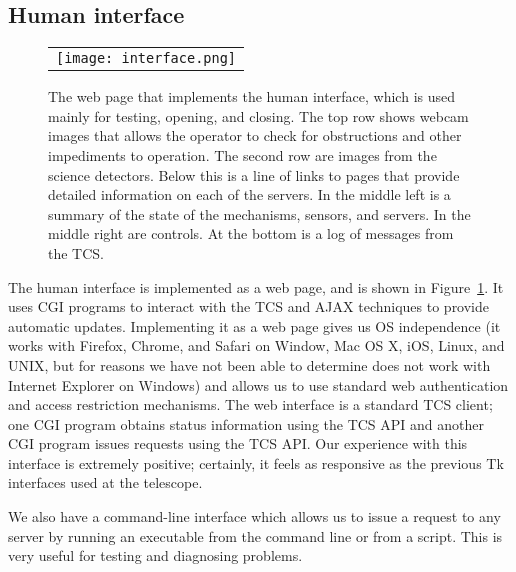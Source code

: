 \documentclass{article}
\begin{document}
\subsection{Human interface}

\begin{figure}
\begin{center}
\begin{tabular}{c}
\texttt{[image: interface.png]}
\end{tabular}
\end{center}
\caption{\label{figure:web-interface} 
The web page that implements the human interface, which is used mainly for testing, opening, and closing. The top row shows webcam images that allows the operator to check for obstructions and other impediments to operation. The second row are images from the science detectors. Below this is a line of links to pages that provide detailed information on each of the servers. In the middle left is a summary of the state of the mechanisms, sensors, and servers. In the middle right are controls. At the bottom is a log of messages from the TCS.}
\end{figure} 


The human interface is implemented as a web page, and is shown in Figure~\ref{figure:web-interface}. It uses CGI programs to interact with the TCS and AJAX techniques to provide automatic updates. Implementing it as a web page gives us OS independence (it works with Firefox, Chrome, and Safari on Window, Mac OS X, iOS, Linux, and UNIX, but for reasons we have not been able to determine does not work with Internet Explorer on Windows) and allows us to use standard web authentication and access restriction mechanisms. The web interface is a standard TCS client; one CGI program obtains status information using the TCS API and another CGI program issues requests using the TCS API. Our experience with this interface is extremely positive; certainly, it feels as responsive as the previous Tk interfaces used at the telescope.

We also have a command-line interface which allows us to issue a request to any server by running an executable from the command line or from a script. This is very useful for testing and diagnosing problems.
\end{document}
